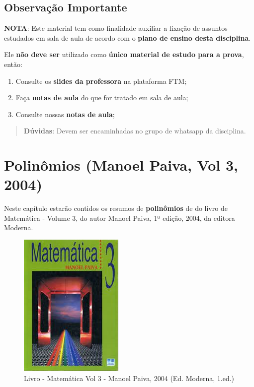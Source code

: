 \documentclass[
]{book}
\providecommand{\tightlist}{%
  \setlength{\itemsep}{0pt}\setlength{\parskip}{0pt}}
\begin{document}
\hypertarget{observauxe7uxe3o-importante}{%
\section{Observação Importante}\label{observauxe7uxe3o-importante}}

\textbf{NOTA}: Este material tem como finalidade auxiliar a fixação de assuntos estudados em sala de aula de acordo com o \textbf{plano de ensino desta disciplina}.

Ele \textbf{não deve ser} utilizado como \textbf{único material de estudo para a prova}, então:

\begin{enumerate}
\def\labelenumi{\arabic{enumi}.}
\tightlist
\item
  Consulte os \textbf{slides da professora} na plataforma FTM;\\
\item
  Faça \textbf{notas de aula} do que for tratado em sala de aula;\\
\item
  Consulte nossas \textbf{notas de aula};
\end{enumerate}

\begin{quote}
\textbf{Dúvidas}: Devem ser encaminhadas no grupo de whatsapp da disciplina.
\end{quote}

\hypertarget{polinuxf4mios-manoel-paiva-vol-3-2004}{%
\chapter{Polinômios (Manoel Paiva, Vol 3, 2004)}\label{polinuxf4mios-manoel-paiva-vol-3-2004}}

Neste capítulo estarão contidos os resumos de \textbf{polinômios} de do livro de Matemática - Volume 3, do autor Manoel Paiva, 1º edição, 2004, da editora Moderna.

\begin{figure}

{\centering \includegraphics[width=0.5\linewidth]{imagens/Capa-Livro-Matematica-Volume-3-Manoel-Paiva-2004} 

}

\caption{Livro - Matemática Vol 3 - Manoel Paiva, 2004 (Ed. Moderna, 1.ed.)}\label{fig:unnamed-chunk-2}
\end{figure}
\end{document}
